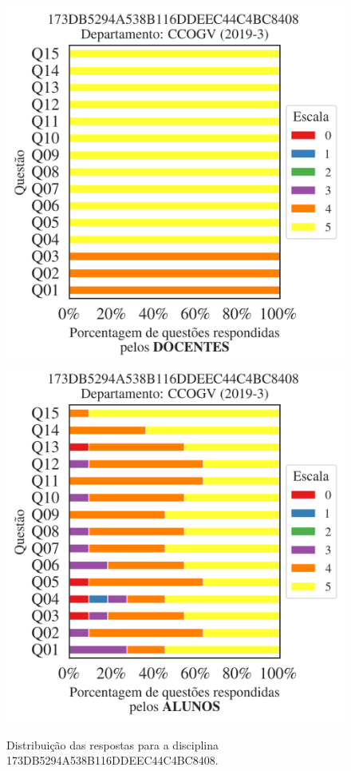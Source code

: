 \documentclass[a4paper,10pt]{article}
\begin{document}
\begin{figure}[h]
\centering
\includegraphics[width=0.485\linewidth]{analise_disciplina_departamento_CCOGV_173DB5294A538B116DDEEC44C4BC8408_docentes.png}
\includegraphics[width=0.485\linewidth]{analise_disciplina_departamento_CCOGV_173DB5294A538B116DDEEC44C4BC8408_alunos.png}
\caption{\label{fig:analise_geral_departamento}                Distribuição das respostas para a disciplina 173DB5294A538B116DDEEC44C4BC8408. }
\end{figure}
\end{document}
